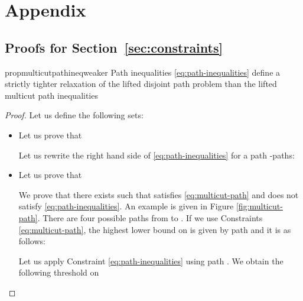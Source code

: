 \documentclass{article}
\begin{document}
\begin{abstract}
This appendix supplements our work by presenting missing proofs regarding the solver and details about our tracker. 

Sections \ref{sec:appendix-constraints} up to Section \ref{sec:appendix-complexity} provide proofs used in Sections \ref{sec:constraints} and \ref{sec:complexity}. 

Section \ref{sec:optimal_assignment_definition} provides further information how  the optimal assignments used in Section \ref{sec:exp_long_range_edges} were obtained. The impact of the employed post-processing used in our tracker is analyzed in Section \ref{sec:ablation_postprocessing}. Details about the used fusion network are given in Section \ref{sec:fusion_network_details}. Finally, evaluation metrics for all tracked sequences are provided in Section \ref{sec:results_all_sequences}. 
\end{abstract}
 \section{Appendix}
\subsection{Proofs for Section~\ref{sec:constraints}}
\label{sec:appendix-constraints}


\begin{restatable}{prop}{multicutpathineqweaker}
\label{prop:multicut-path-inequalities weaker}
Path inequalities \eqref{eq:path-inequalities} define a strictly tighter relaxation of the lifted disjoint path problem than the lifted multicut path inequalities

\end{restatable}
\begin{proof}
Let us define the following sets:

\begin{itemize}
    \item Let us prove that 
    
    Let us rewrite the right hand side of \eqref{eq:path-inequalities} for a path -paths:
 
\item Let us prove that  

We prove that there exists  such that  satisfies \eqref{eq:multicut-path} and does not satisfy \eqref{eq:path-inequalities}. 
An example is given in Figure \ref{fig:multicut-path}.
There are four possible paths from  to .
If we use Constraints \eqref{eq:multicut-path}, the highest lower bound on  is given by path  and it is as follows:

Let us apply Constraint \eqref{eq:path-inequalities} using path . We obtain the following threshold on 

\end{itemize}
\end{proof}
\end{document}
